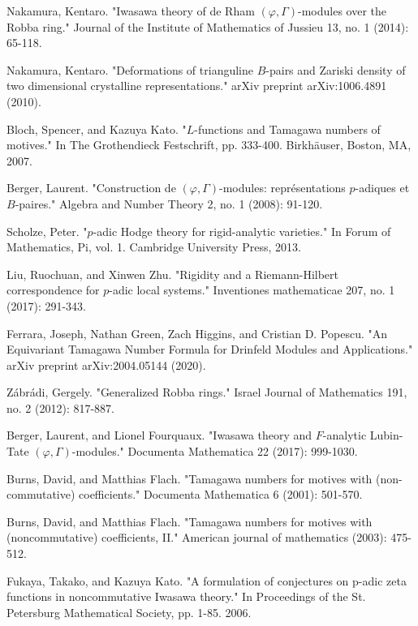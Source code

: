 \documentclass[12pt]{amsart}
\theoremstyle{definition}
\numberwithin{equation}{section}
\begin{document}
\begin{thebibliography}{10}
 Nakamura, Kentaro. "Iwasawa theory of de Rham $(\varphi,\Gamma) $-modules over the Robba ring." Journal of the Institute of Mathematics of Jussieu 13, no. 1 (2014): 65-118.

 Nakamura, Kentaro. "Deformations of trianguline $B$-pairs and Zariski density of two dimensional crystalline representations." arXiv preprint arXiv:1006.4891 (2010).

 Bloch, Spencer, and Kazuya Kato. "$L$-functions and Tamagawa numbers of motives." In The Grothendieck Festschrift, pp. 333-400. Birkh\"auser, Boston, MA, 2007. 

 Berger, Laurent. "Construction de $(\varphi,\Gamma)$-modules: repr\'esentations $p$-adiques et $B$-paires." Algebra and Number Theory 2, no. 1 (2008): 91-120.

 Scholze, Peter. "$ p $-adic Hodge theory for rigid-analytic varieties." In Forum of Mathematics, Pi, vol. 1. Cambridge University Press, 2013.

 Liu, Ruochuan, and Xinwen Zhu. "Rigidity and a Riemann-Hilbert correspondence for $p$-adic local systems." Inventiones mathematicae 207, no. 1 (2017): 291-343.


 Ferrara, Joseph, Nathan Green, Zach Higgins, and Cristian D. Popescu. "An Equivariant Tamagawa Number Formula for Drinfeld Modules and Applications." arXiv preprint arXiv:2004.05144 (2020).

 Z\'abr\'adi, Gergely. "Generalized Robba rings." Israel Journal of Mathematics 191, no. 2 (2012): 817-887. 


 Berger, Laurent, and Lionel Fourquaux. "Iwasawa theory and $ F $-analytic Lubin-Tate $(\varphi,\Gamma) $-modules." Documenta Mathematica 22 (2017): 999-1030.


 Burns, David, and Matthias Flach. "Tamagawa numbers for motives with (non-commutative) coefficients." Documenta Mathematica 6 (2001): 501-570.

 Burns, David, and Matthias Flach. "Tamagawa numbers for motives with (noncommutative) coefficients, II." American journal of mathematics (2003): 475-512.

 Fukaya, Takako, and Kazuya Kato. "A formulation of conjectures on p-adic zeta functions in noncommutative Iwasawa theory." In Proceedings of the St. Petersburg Mathematical Society, pp. 1-85. 2006.


\end{thebibliography}
\end{document}
